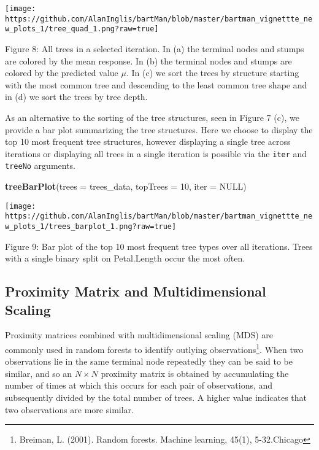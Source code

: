\documentclass[
]{article}
\newenvironment{Shaded}{\begin{snugshade}}{\end{snugshade}}
\newcommand{\AttributeTok}[1]{\textcolor[rgb]{0.13,0.29,0.53}{#1}}
\newcommand{\ConstantTok}[1]{\textcolor[rgb]{0.56,0.35,0.01}{#1}}
\newcommand{\DecValTok}[1]{\textcolor[rgb]{0.00,0.00,0.81}{#1}}
\newcommand{\FunctionTok}[1]{\textcolor[rgb]{0.13,0.29,0.53}{\textbf{#1}}}
\newcommand{\NormalTok}[1]{#1}
\begin{document}
\begin{center}\texttt{[image: https://github.com/AlanInglis/bartMan/blob/master/bartman\_vignettte\_new\_plots\_1/tree\_quad\_1.png?raw=true]} \end{center}

\protect\hypertarget{fig8:fig8}{}{Figure 8: }All trees in a selected
iteration. In (a) the terminal nodes and stumps are colored by the mean
response. In (b) the terminal nodes and stumps are colored by the
predicted value \(\mu\). In (c) we sort the trees by structure starting
with the most common tree and descending to the least common tree shape
and in (d) we sort the trees by tree depth.

As an alternative to the sorting of the tree structures, seen in Figure
7 (c), we provide a bar plot summarizing the tree structures. Here we
choose to display the top 10 most frequent tree structures, however
displaying a single tree across iterations or displaying all trees in a
single iteration is possible via the \texttt{iter} and \texttt{treeNo}
arguments.

\begin{Shaded}
\begin{Highlighting}[]
\FunctionTok{treeBarPlot}\NormalTok{(}\AttributeTok{trees =}\NormalTok{ trees\_data, }\AttributeTok{topTrees =} \DecValTok{10}\NormalTok{, }\AttributeTok{iter =} \ConstantTok{NULL}\NormalTok{)}
\end{Highlighting}
\end{Shaded}

\begin{center}\texttt{[image: https://github.com/AlanInglis/bartMan/blob/master/bartman\_vignettte\_new\_plots\_1/trees\_barplot\_1.png?raw=true]} \end{center}

\protect\hypertarget{fig9:fig9}{}{Figure 9: } Bar plot of the top 10
most frequent tree types over all iterations. Trees with a single binary
split on Petal.Length occur the most often.

\hypertarget{proximity-matrix-and-multidimensional-scaling}{%
\subsection{Proximity Matrix and Multidimensional
Scaling}\label{proximity-matrix-and-multidimensional-scaling}}

Proximity matrices combined with multidimensional scaling (MDS) are
commonly used in random forests to identify outlying
observations\footnote{Breiman, L. (2001). Random forests. Machine
  learning, 45(1), 5-32.Chicago}. When two observations lie in the same
terminal node repeatedly they can be said to be similar, and so an
\(N × N\) proximity matrix is obtained by accumulating the number of
times at which this occurs for each pair of observations, and
subsequently divided by the total number of trees. A higher value
indicates that two observations are more similar.
\end{document}
